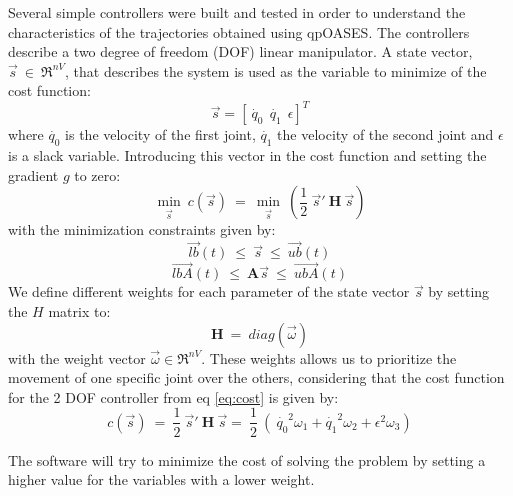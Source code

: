 Several simple controllers were built and tested in order to understand the characteristics of the trajectories obtained using qpOASES. The controllers describe a two degree of freedom (DOF) linear manipulator. A state vector, $\vec{s}\ \in\ \Re^{nV}$, that describes the system is used as the variable to minimize of the cost function:
\begin{equation}
 \vec{s} = [\dot{\ q_{0}} \ \ \dot{q_{1}} \ \ \epsilon ]^{T}
\end{equation}
where $\dot{q_{0}}$ is the velocity of the first joint, $\dot{q_{1}}$ the velocity of the second joint and $\epsilon$ is a slack variable. Introducing this vector in the cost function and setting the gradient $g$ to zero:
\begin{equation}
\underset{\vec{s}}{\min}\ c(\vec{s})\ =\  \underset{\vec{s}}{\min}\ \left( \frac{1}{2} \ \vec{s}' \ \textbf{H} \ \vec{s} \right)
\label{eq:cost}
\end{equation}
with the minimization constraints given by:
\begin{equation}
\vec{lb}(t)\ \leq\ \vec{s}\ \leq\ \vec{ub}(t)
\label{eq:constrain}
\end{equation}
\begin{equation}
\vec{lbA}(t)\ \leq\ \textbf{A} \vec{s}\ \leq\ \vec{ubA}(t)
\label{eq:constrainA}
\end{equation}
We define different weights for each parameter of the state vector $\vec{s}$ by setting the $H$ matrix to:
\begin{equation*}
\textbf{H}\ =\ diag(\vec{\omega})
\end{equation*}
with the weight vector $\vec{\omega} \in \Re^{nV}$. These weights allows us to prioritize the movement of one specific joint over the others, considering that the cost function for the 2 DOF controller from eq \ref{eq:cost} is given by:
\begin{equation}
c(\vec{s})\ =\ \frac{1}{2} \ \vec{s}' \ \textbf{H} \ \vec{s} =\ \frac{1}{2} \ (\ \dot{q_{0}}^{2}\omega_{1} + \dot{q_{1}}^{2}\omega_{2} + \epsilon^{2}\omega_{3})
\end{equation}

The software will try to minimize the cost of solving the problem by setting a higher value for the variables with a lower weight.

